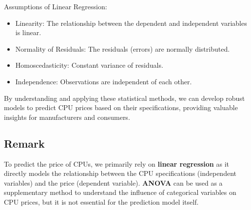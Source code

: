 Assumptions of Linear Regression:
\begin{itemize}
    \item Linearity: The relationship between the dependent and independent variables is linear.
    \item Normality of Residuals: The residuals (errors) are normally distributed.
    \item Homoscedasticity: Constant variance of residuals.
    \item Independence: Observations are independent of each other.
\end{itemize}

By understanding and applying these statistical methods, we can develop robust models to predict CPU prices based on their specifications, providing valuable insights for manufacturers and consumers.

\subsection{Remark}
To predict the price of CPUs, we primarily rely on \textbf{linear regression} as it directly models the relationship between the CPU specifications (independent variables) and the price (dependent variable). \textbf{ANOVA} can be used as a supplementary method to understand the influence of categorical variables on CPU prices, but it is not essential for the prediction model itself. 

\newpage